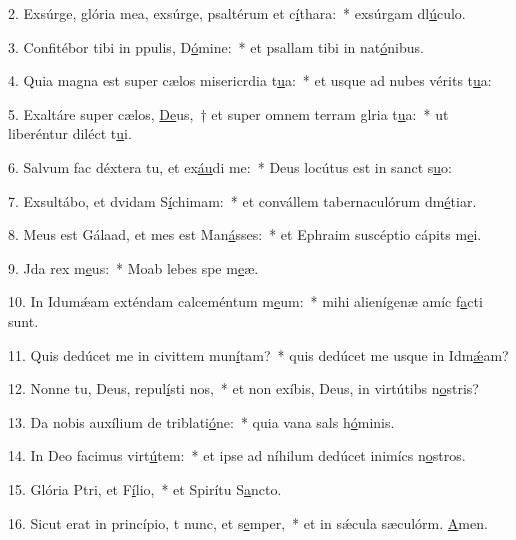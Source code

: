 2. Exsúrge, glória mea, exsúrge, psaltérum et c\uline{í}thara:~* exsúrgam dl\uline{ú}culo.\par 
3. Confitébor tibi in ppulis, D\uline{ó}mine:~* et psallam tibi in nat\uline{ó}nibus.\par 
4. Quia magna est super cælos misericrdia t\uline{u}a:~* et usque ad nubes vérits t\uline{u}a:\par 
5. Exaltáre super cælos, \uline{De}us,~† et super omnem terram glria t\uline{u}a:~* ut liberéntur diléct t\uline{u}i.\par 
6. Salvum fac déxtera tu, et ex\uline{áu}di me:~* Deus locútus est in sanct s\uline{u}o:\par 
7. Exsultábo, et dvidam S\uline{í}chimam:~* et convállem tabernaculórum dm\uline{é}tiar.\par 
8. Meus est Gálaad, et mes est Man\uline{á}sses:~* et Ephraim suscéptio cápits m\uline{e}i.\par 
9. Jda rex m\uline{e}us:~* Moab lebes spe m\uline{e}æ.\par 
10. In Idumǽam exténdam calceméntum m\uline{e}um:~* mihi alienígenæ amíc f\uline{a}cti sunt.\par 
11. Quis dedúcet me in civittem mun\uline{í}tam?~* quis dedúcet me usque in Idm\uline{ǽ}am?\par 
12. Nonne tu, Deus,  repul\uline{í}sti nos,~* et non exíbis, Deus, in virtútibs n\uline{o}stris?\par 
13. Da nobis auxílium de triblati\uline{ó}ne:~* quia vana sals h\uline{ó}minis.\par 
14. In Deo facimus virt\uline{ú}tem:~* et ipse ad níhilum dedúcet inimícs n\uline{o}stros.\par 
15. Glória Ptri, et F\uline{í}lio,~* et Spirítu S\uline{a}ncto.\par 
16. Sicut erat in princípio, t nunc, et s\uline{e}mper,~* et in sǽcula sæculórm. \uline{A}men.\par 
